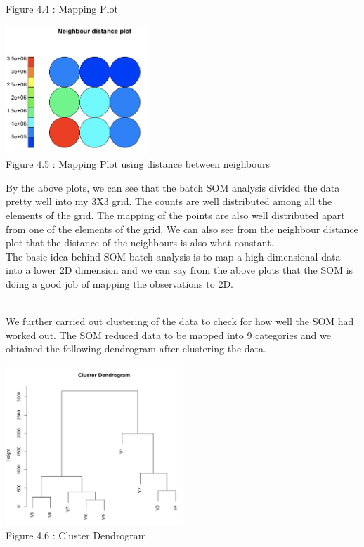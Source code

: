 \documentclass[11pt]{article}
\begin{document}
\begin{enumerate}
\begin{center}
    \\\footnotesize Figure 4.4 : Mapping Plot
\end{center}
\begin{center}
    \includegraphics[width=0.4\textwidth]{4_E.png}
    \\\footnotesize Figure 4.5 : Mapping Plot using distance between neighbours
\end{center}

By the above plots, we can see that the batch SOM analysis divided the data pretty well into my 3X3 grid. The counts are well distributed among all the elements of the grid. The mapping of the points are also well distributed apart from one of the elements of the grid. We can also see from the neighbour distance plot that the distance of the neighbours is also what constant.
\\The basic idea behind SOM  batch analysis is to map a  high dimensional data into a lower 2D dimension and we can say from the above plots that the SOM is doing a good job of mapping the observations to 2D.

\\We further carried out  clustering of the data to check for how well the SOM had worked out. The SOM reduced data to be  mapped into 9 categories and we obtained the following dendrogram after clustering the data.

\begin{center}
    \includegraphics[width=0.5\textwidth]{4_F.png}
    \\\footnotesize Figure 4.6 : Cluster Dendrogram
\end{center}


\end{enumerate}
\end{document}

